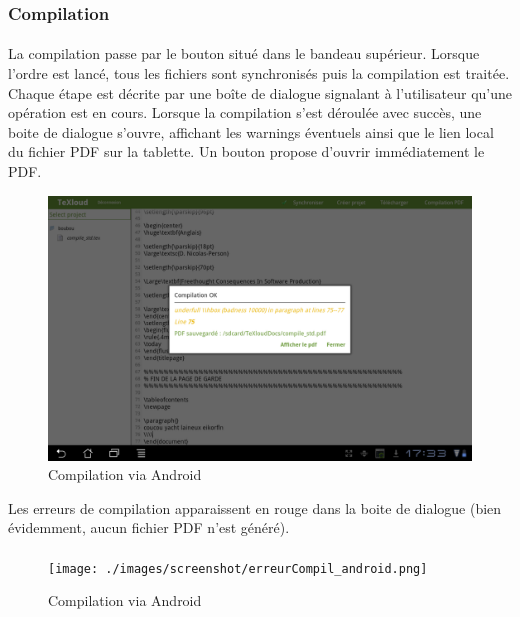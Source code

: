 \documentclass[a4paper,12pt]{article}
\begin{document}
\subsubsection{Compilation}
\paragraph*{}
La compilation passe par le bouton situé dans le bandeau supérieur. Lorsque l'ordre est lancé, tous les fichiers sont synchronisés puis la compilation est traitée. Chaque étape est décrite par une boîte de dialogue signalant à l'utilisateur qu'une opération est en cours.
Lorsque la compilation s'est déroulée avec succès, une boite de dialogue s'ouvre, affichant les warnings éventuels ainsi que le lien local du fichier PDF sur la tablette. Un bouton propose d'ouvrir immédiatement le PDF.

\begin{figure}[!ht]
\begin{center}
  \includegraphics[width=1\textwidth]{./images/screenshot/compil_android.png}
\end{center}
  \caption{Compilation via Android}
  \label{Compilation via Android}
\end{figure}

Les erreurs de compilation apparaissent en rouge dans la boite de dialogue (bien évidemment, aucun fichier PDF n'est généré).

\paragraph*{}
\begin{figure}[!ht]
\begin{center}
  \texttt{[image: ./images/screenshot/erreurCompil\_android.png]}
\end{center}
  \caption{Compilation via Android}
  \label{Compilation via Android}
\end{figure}
\end{document}
